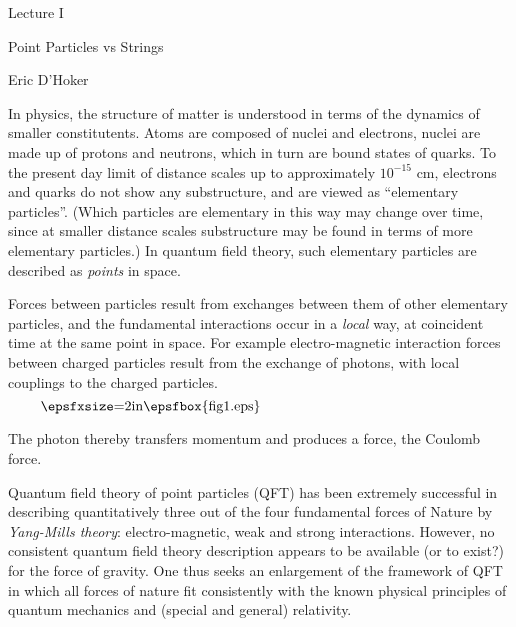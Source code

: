 
\def\scrA{{\scr A}}   \def\scrB{{\scr B}}
\def\scrC{{\scr C}}   \def\scrD{{\scr D}}
\def\scrE{{\scr E}}   \def\scrF{{\scr F}}
\def\scrG{{\scr G}}   \def\scrH{{\scr H}}
\def\scrI{{\scr I}}   \def\scrJ{{\scr J}}
\def\scrK{{\scr K}}   \def\scrL{{\scr L}}
\def\scrM{{\scr M}}   \def\scrN{{\scr N}}
\def\scrO{{\scr O}}   \def\scrP{{\scr P}}
\def\scrQ{{\scr Q}}   \def\scrR{{\scr R}}
\def\scrS{{\scr S}}   \def\scrT{{\scr T}}
\def\scrU{{\scr U}}   \def\scrV{{\scr V}}
\def\scrW{{\scr W}}   \def\scrX{{\scr X}}
\def\scrY{{\scr Y}}   \def\scrZ{{\scr Z}}



\def\scr#1{{\fam\eusmfam\relax#1}}

\def\scrH{{\scr H}}
\def\scrL{{\scr L}}


\bigskip\bigskip
\centerline{\boldtitlefont Lecture I}
\bigskip
\centerline{\boldtitlefont Point Particles 
 {\ninerm vs} Strings}

\medskip
\centerline{Eric D'Hoker}

\frenchspacing

\dspace
\bigskip
In physics, the structure of matter is understood in
terms of the dynamics of smaller constitutents.
Atoms are composed of nuclei and electrons, nuclei are
made up of protons and neutrons, which in turn are
bound states of quarks.
To the present day limit of distance scales up to
approximately
$10^{-15}$ cm, electrons and quarks do not show any
substructure, and are viewed as ``elementary
particles''.
(Which particles are elementary in this way may change
over time, since at smaller distance scales
substructure may be found in terms of more elementary
particles.)
In quantum field theory, such elementary particles are
described as {\it points} in space.

Forces between particles result from exchanges between
them of other elementary particles, and the
fundamental interactions occur in a {\it local} way,
at coincident time at the same point in space.
For example electro-magnetic interaction forces
between charged particles result from the exchange of
photons, with local couplings to the charged
particles.
$$
\vbox{\epsfxsize=2in\epsfbox{fig1.eps}}
$$

\noindent
The photon thereby transfers momentum and produces a
force, the Coulomb force.

Quantum field theory of point particles (QFT) has been
extremely successful in describing quantitatively
three out of the four fundamental forces of Nature by
{\it Yang-Mills theory}: electro-magnetic, weak and
strong interactions.
However, no consistent quantum field theory
description appears to be available (or to exist?) for
the force of gravity.
One thus seeks an enlargement of the framework of QFT
in which all forces of nature fit consistently with
the known physical principles of quantum mechanics and
(special and general) relativity.

